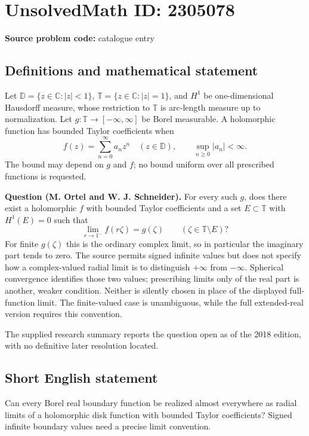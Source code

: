 \documentclass[11pt]{article}
\begin{document}
\section*{UnsolvedMath ID: 2305078}
\textbf{Source problem code:} catalogue entry
\subsection{Definitions and mathematical statement}
Let $\mathbb D=\{z\in\mathbb C:|z|<1\}$, $\mathbb T=\{z\in\mathbb C:|z|=1\}$, and $H^1$ be one-dimensional Hausdorff measure, whose restriction to $\mathbb T$ is arc-length measure up to normalization. Let $g:\mathbb T\to[-\infty,\infty]$ be Borel measurable. A holomorphic function has bounded Taylor coefficients when
\[
f(z)=\sum_{n=0}^{\infty}a_nz^n\quad(z\in\mathbb D),\qquad
\sup_{n\geq0}|a_n|<\infty.
\]
The bound may depend on $g$ and $f$; no bound uniform over all prescribed functions is requested.

\textbf{Question (M. Ortel and W. J. Schneider).} For every such $g$, does there exist a holomorphic $f$ with bounded Taylor coefficients and a set $E\subset\mathbb T$ with $H^1(E)=0$ such that
\[
\lim_{r\to1^-}f(r\zeta)=g(\zeta)\qquad(\zeta\in\mathbb T\setminus E)?
\]
For finite $g(\zeta)$ this is the ordinary complex limit, so in particular the imaginary part tends to zero. The source permits signed infinite values but does not specify how a complex-valued radial limit is to distinguish $+\infty$ from $-\infty$. Spherical convergence identifies those two values; prescribing limits only of the real part is another, weaker condition. Neither is silently chosen in place of the displayed full-function limit. The finite-valued case is unambiguous, while the full extended-real version requires this convention.

The supplied research summary reports the question open as of the 2018 edition, with no definitive later resolution located.
\subsection{Short English statement}
Can every Borel real boundary function be realized almost everywhere as radial limits of a holomorphic disk function with bounded Taylor coefficients? Signed infinite boundary values need a precise limit convention.
\end{document}
